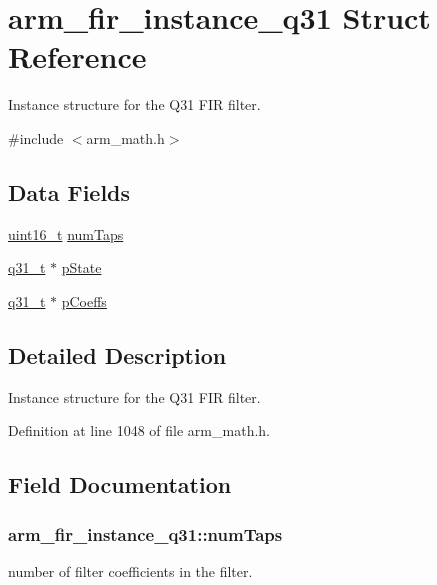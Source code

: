 \hypertarget{structarm__fir__instance__q31}{\section{arm\-\_\-fir\-\_\-instance\-\_\-q31 Struct Reference}
\label{structarm__fir__instance__q31}
}


Instance structure for the Q31 F\-I\-R filter.  




{\ttfamily \#include $<$arm\-\_\-math.\-h$>$}

\subsection*{Data Fields}
\begin{DoxyCompactItemize}
\item 
\hyperlink{stdint_8h_a273cf69d639a59973b6019625df33e30}{uint16\-\_\-t} \hyperlink{structarm__fir__instance__q31_a918fadd775b7a0482b21bf34dae2f094}{num\-Taps}
\item 
\hyperlink{arm__math_8h_adc89a3547f5324b7b3b95adec3806bc0}{q31\-\_\-t} $\ast$ \hyperlink{structarm__fir__instance__q31_a409f39c93b744784648bdc365541444d}{p\-State}
\item 
\hyperlink{arm__math_8h_adc89a3547f5324b7b3b95adec3806bc0}{q31\-\_\-t} $\ast$ \hyperlink{structarm__fir__instance__q31_afaae4c884bdf11a4ec2f3b9bb2bb51d0}{p\-Coeffs}
\end{DoxyCompactItemize}


\subsection{Detailed Description}
Instance structure for the Q31 F\-I\-R filter. 

Definition at line 1048 of file arm\-\_\-math.\-h.



\subsection{Field Documentation}
\hypertarget{structarm__fir__instance__q31_a918fadd775b7a0482b21bf34dae2f094}{
\subsubsection[{num\-Taps}]{ arm\-\_\-fir\-\_\-instance\-\_\-q31\-::num\-Taps}}\label{structarm__fir__instance__q31_a918fadd775b7a0482b21bf34dae2f094}
number of filter coefficients in the filter. 


